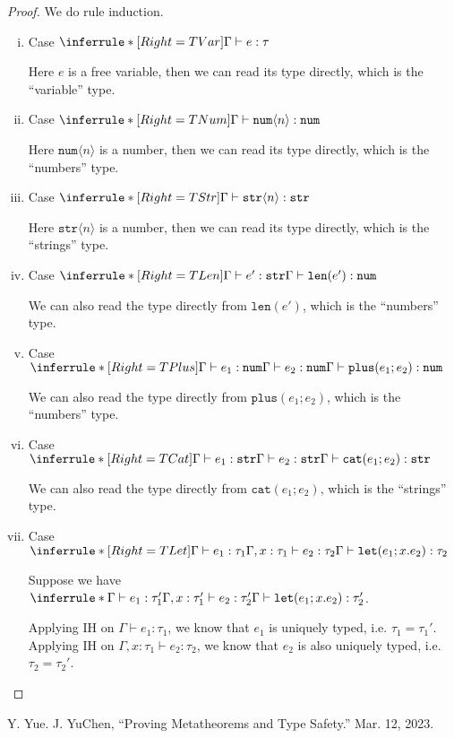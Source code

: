 \documentclass{article}
\theoremstyle{definition}
\newcommand{\ip}[1]{\langle #1 \rangle}
\begin{document}
\begin{proof}
    We do rule induction.
    \begin{enumerate}[i)]
        \item Case $\inferrule*[Right=TVar]{ }{\Gamma \vdash e : \tau}$

              Here $e$ is a free variable, then we can read its type directly, which is the ``variable'' type.
        \item Case $\inferrule*[Right=TNum]{ }{\Gamma \vdash \mathtt{num}\ip{n} : \mathtt{num}}$

              Here $\mathtt{num}\ip{n}$ is a number, then we can read its type directly, which is the ``numbers'' type.
        \item Case $\inferrule*[Right=TStr]{ }{\Gamma \vdash \mathtt{str}\ip{n} : \mathtt{str}}$

              Here $\mathtt{str}\ip{n}$ is a number, then we can read its type directly, which is the ``strings'' type.
        \item Case $\inferrule*[Right=TLen]{\Gamma \vdash e':\mathtt{str}}{\Gamma \vdash \mathtt{len}(e') : \mathtt{num}}$

              We can also read the type directly from $\mathtt{len}(e')$, which is the ``numbers'' type.
        \item Case $\inferrule*[Right=TPlus]{\Gamma \vdash e_1:\mathtt{num}\\ \Gamma \vdash e_2:\mathtt{num}}{\Gamma \vdash \mathtt{plus}(e_1;e_2) : \mathtt{num}}$

              We can also read the type directly from $\mathtt{plus}(e_1;e_2)$, which is the ``numbers'' type.
        \item Case $\inferrule*[Right=TCat]{\Gamma \vdash e_1:\mathtt{str}\\ \Gamma \vdash e_2:\mathtt{str}}{\Gamma \vdash \mathtt{cat}(e_1;e_2) : \mathtt{str}}$

              We can also read the type directly from $\mathtt{cat}(e_1;e_2)$, which is the ``strings'' type.
        \item Case $\inferrule*[Right=TLet]{\Gamma \vdash e_1:\tau_1 \\ \Gamma,x:\tau_1 \vdash e_2:\tau_2}{\Gamma \vdash \mathtt{let}(e_1;x.e_2) : \tau_2}$

              Suppose we have $\inferrule*{\Gamma \vdash e_1:\tau_1' \\ \Gamma,x:\tau_1' \vdash e_2:\tau_2'}{\Gamma \vdash \mathtt{let}(e_1;x.e_2) : \tau_2'}$.

              Applying IH on $\Gamma \vdash e_1:\tau_1$, we know that $e_1$ is uniquely typed, i.e. $\tau_1 = \tau_1'$.
              Applying IH on $\Gamma,x:\tau_1 \vdash e_2:\tau_2$, we know that $e_2$ is also uniquely typed, i.e. $\tau_2 = \tau_2'$.
    \end{enumerate}
\end{proof}

\begin{thebibliography}{9}
     Y. Yue. J. YuChen, “Proving Metatheorems and Type Safety.” Mar. 12, 2023.
\end{thebibliography}
\end{document}
